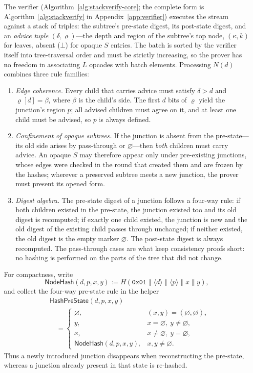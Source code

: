 \documentclass[twocolumn]{article}
\begin{document}
The verifier (Algorithm~\ref{alg:stackverify-core}; the complete form is Algorithm~\ref{alg:stackverify} in Appendix~\ref{app:verifier}) executes the stream against a stack of triples: the subtree's pre-state digest, its post-state digest, and an \emph{advice tuple} $(\delta, \varrho)$---the depth and region of the subtree's top node, $(\kappa, k)$ for leaves, absent ($\bot$) for opaque $S$ entries. The batch is sorted by the verifier itself into tree-traversal order and must be strictly increasing, so the prover has no freedom in associating $L$ opcodes with batch elements. Processing $N(d)$ combines three rule families:
\begin{enumerate}[nosep]
  \item \emph{Edge coherence.} Every child that carries advice must satisfy $\delta > d$ and $\varrho[d] = \beta$, where $\beta$ is the child's side. The first $d$ bits of $\varrho$ yield the junction's region $p$; all advised children must agree on it, and at least one child must be advised, so $p$ is always defined.
  \item \emph{Confinement of opaque subtrees.} If the junction is absent from the pre-state---its old side arises by pass-through or $\varnothing$---then \emph{both} children must carry advice. An opaque $S$ may therefore appear only under pre-existing junctions, whose edges were checked in the round that created them and are frozen by the hashes; wherever a preserved subtree meets a new junction, the prover must present its opened form.
  \item \emph{Digest algebra.} The pre-state digest of a junction follows a four-way rule: if both children existed in the pre-state, the junction existed too and its old digest is recomputed; if exactly one child existed, the junction is new and the old digest of the existing child passes through unchanged; if neither existed, the old digest is the empty marker $\varnothing$. The post-state digest is always recomputed. The pass-through cases are what keep consistency proofs short: no hashing is performed on the parts of the tree that did not change.
\end{enumerate}

For compactness, write
\[
  \mathsf{NodeHash}(d,p,x,y)
  :=H(\texttt{0x01}\|\langle d\rangle\|\langle p\rangle\|x\|y),
\]
and collect the four-way pre-state rule in the helper
\begin{equation}
\begin{aligned}
&\mathsf{HashPreState}(d,p,x,y)\\[-0.25ex]
&\quad =
  \begin{cases}
    \varnothing, & (x,y)=(\varnothing,\varnothing),\\
    y,           & x=\varnothing,\ y\neq\varnothing,\\
    x,           & x\neq\varnothing,\ y=\varnothing,\\
    \mathsf{NodeHash}(d,p,x,y), & x,y\neq\varnothing.
  \end{cases}
\end{aligned}
\label{eq:hash-pre-state}
\end{equation}
Thus a newly introduced junction disappears when reconstructing the pre-state, whereas a junction already present in that state is re-hashed.
\end{document}
